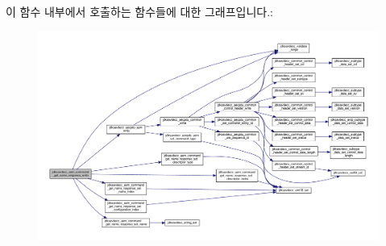 이 함수 내부에서 호출하는 함수들에 대한 그래프입니다.\+:
\nopagebreak
\begin{figure}[H]
\begin{center}
\leavevmode
\includegraphics[width=350pt]{group__command__get__name__response_gafd09b3e608bdbb9db963095f5cfce288_cgraph}
\end{center}
\end{figure}


